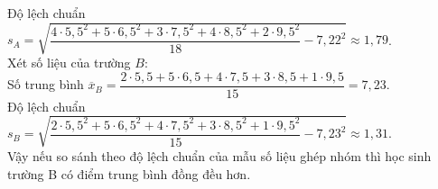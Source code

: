 \begin{ex}
{\begin{itemchoice}
			Độ lệch chuẩn $s_A=\sqrt{\dfrac{4\cdot 5{,}5^2+5\cdot 6{,}5^2+3\cdot 7{,}5^2+4\cdot  8{,}5^2+2\cdot 9{,}5^2}{18}-7{,}22^2}\approx 1{,}79$.\\
			 Xét số liệu của trường $B$:\\
			Số trung  bình $\overline{x}_B=\dfrac{2\cdot 5{,}5+5\cdot 6{,}5+4\cdot 7{,}5+3\cdot 8{,}5+1\cdot 9{,}5}{15}=7{,}23$.\\
			Độ  lệch chuẩn $s_B=\sqrt{\dfrac{2\cdot 5{,}5^2+5\cdot 6{,}5^2+4\cdot 7{,}5^2+3\cdot 8{,}5^2+1\cdot 9{,}5^2}{15}-7{,}23^2}\approx 1{,}31$.\\
			Vậy nếu so sánh theo độ lệch chuẩn của mẫu số liệu ghép nhóm thì học sinh trường B có điểm trung bình  đồng đều hơn.
		\end{itemchoice}
	} 
\end{ex}

